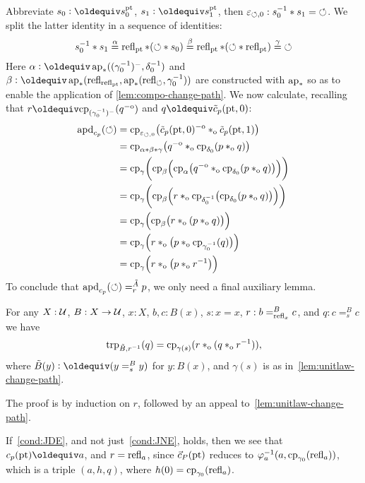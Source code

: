 \documentclass[a4paper,12pt]{amsart}
\begin{document}
Abbreviate $s_0 \defeq s^\pt_0$, $s_1 \defeq s^\pt_1$,
then $\varepsilon_{{\circlearrowleft},0} : s_0^{-1} * s_1 = {{\circlearrowleft}}$.
We split the latter identity in a sequence of identities:
\[
s_0^{-1} * s_1 \stackrel{\alpha}{=}
\mathop{{\mathrm{refl}}_{{\mathord{\mathrm{pt}}}}}*({\circlearrowleft}* s_0) \stackrel{\beta}{=}
\mathop{{\mathrm{refl}}_{{\mathord{\mathrm{pt}}}}}*({\circlearrowleft}*\mathop{{\mathrm{refl}}_{{\mathord{\mathrm{pt}}}}})\stackrel{\gamma}{=} {{\circlearrowleft}}
\]
Here $\alpha\defeq\apc((\gamma_0^{-1})^-,\delta_0^{-1})$ and
$\beta\defeq\apc(\refl{\refl{\pt}},\apc(\refl{\Zloop},\gamma_0^{-1}))$ are constructed with $\mathop{\mathrm{ap}_{*}}$ so as to
enable the application of \cref{lem:compo-change-path}.
We now calculate, recalling that $r\jdeq\cp{(\gamma_0^{-1})^-}(q\invo)$
and $q\jdeq\tilde c_p(\pt,0)$:
\allowdisplaybreaks
\begin{align*}
  \mathop{{\mathrm{apd}}_{c_p}}({\circlearrowleft})
  &= \mathrm{cp}_{\varepsilon_{{\circlearrowleft},0}}
    \bigl(\tilde c_p({\mathord{\mathrm{pt}}},0)^{-\mathrm{o}} \mathbin{*_{\mathrm{o}}} \tilde c_p({\mathord{\mathrm{pt}}},1)\bigr) \\
  &= \mathrm{cp}_{\alpha*\beta*\gamma}
    \bigl(q^{-\mathrm{o}} \mathbin{*_{\mathrm{o}}} \mathrm{cp}_{\delta_0}(p \mathbin{*_{\mathrm{o}}} q)\bigr) \\
  &= \mathrm{cp}_{\gamma}\biggl(\mathrm{cp}_{\beta}\Bigl(\mathrm{cp}_{\alpha}
    \bigl(q^{-\mathrm{o}} \mathbin{*_{\mathrm{o}}} \mathrm{cp}_{\delta_0}(p \mathbin{*_{\mathrm{o}}} q)\bigr)\Bigr)\biggr) \\
  &= \mathrm{cp}_{\gamma}\biggl(\mathrm{cp}_{\beta}\Bigl(
    r \mathbin{*_{\mathrm{o}}} \mathrm{cp}_{\delta_0^{-1}}\bigl(\mathrm{cp}_{\delta_0}(p \mathbin{*_{\mathrm{o}}} q)\bigr)
    \Bigr)\biggr) \\
  &= \mathrm{cp}_{\gamma}\Bigl(\mathrm{cp}_{\beta}\bigl(
    r \mathbin{*_{\mathrm{o}}} (p \mathbin{*_{\mathrm{o}}} q)\bigr)\Bigr) \\
  &= \mathrm{cp}_{\gamma}\Bigl(r \mathbin{*_{\mathrm{o}}} \bigl(p \mathbin{*_{\mathrm{o}}} \mathrm{cp}_{\gamma_0^{-1}}(q)\bigl)\Bigr) \\
  &= \mathrm{cp}_{\gamma}\Bigl(r \mathbin{*_{\mathrm{o}}} \bigl(p \mathbin{*_{\mathrm{o}}} r^{-1}\bigl)\Bigr)
\end{align*}
To conclude that $\mathop{{\mathrm{apd}}_{c_p}}({\circlearrowleft}) =^{\tilde A}_r p$, we only need
a final auxiliary lemma.

\begin{lemma}
  For any $X : \mathcal{U}$, $B : X \to \mathcal{U}$, $x:X$, $b,c:B(x)$,
  $s : x=x$, $r : b =^B_{\mathop{{\mathrm{refl}}_{x}}} c$, and $q : c =^B_s c$
  we have
  \[
    \mathop{\mathrm{trp}_{\tilde B,r^{-1}}}(q) =
    \mathrm{cp}_{\gamma(s)}(r \mathbin{*_{\mathrm{o}}} (q \mathbin{*_{\mathrm{o}}} r^{-1})),
  \]
  where $\tilde B(y) \defeq (y =^B_s y)$ for $y:B(x)$,
  and $\gamma(s)$ is as in~\cref{lem:unitlaw-change-path}.
\end{lemma}
The proof is by induction on $r$, followed by an appeal
to~\cref{lem:unitlaw-change-path}.

If~\cref{cond:JDE}, and not just~\cref{cond:JNE}, holds,
then we see that $c_p(\pt)\jdeq a$, and $r=\mathop{{\mathrm{refl}}_{a}}$,
since $\vec c_P({\mathord{\mathrm{pt}}})$ reduces to
$\varphi_{a}^{-1}(a,\mathrm{cp}_{\gamma_0}(\mathop{{\mathrm{refl}}_{a}}))$,
which is a triple $(a,h,q)$, where $h(0)=\mathrm{cp}_{\gamma_0}(\mathop{{\mathrm{refl}}_{a}})$.
\end{document}
